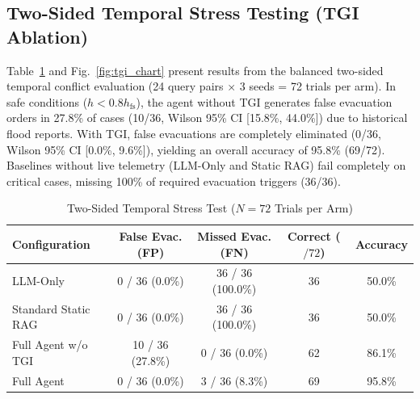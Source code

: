 \documentclass[conference]{IEEEtran}
\begin{document}
\subsection{Two-Sided Temporal Stress Testing (TGI Ablation)}
Table~\ref{tab:tgi} and Fig.~\ref{fig:tgi_chart} present results from the balanced two-sided temporal conflict evaluation (24 query pairs $\times$ 3 seeds = 72 trials per arm). In safe conditions ($h < 0.8 h_{\mathrm{fs}}$), the agent without TGI generates false evacuation orders in 27.8\% of cases (10/36, Wilson 95\% CI [15.8\%, 44.0\%]) due to historical flood reports. With TGI, false evacuations are completely eliminated (0/36, Wilson 95\% CI [0.0\%, 9.6\%]), yielding an overall accuracy of 95.8\% (69/72). Baselines without live telemetry (LLM-Only and Static RAG) fail completely on critical cases, missing 100\% of required evacuation triggers (36/36).

\begin{table}[!t]
\caption{Two-Sided Temporal Stress Test ($N=72$ Trials per Arm)}
\label{tab:tgi}
\centering
\scriptsize
\setlength{\tabcolsep}{1.5pt}
\begin{tabular*}{\columnwidth}{@{\extracolsep{\fill}}lcccc@{}}
\toprule
Configuration & False Evac. (FP) & Missed Evac. (FN) & Correct ($/72$) & Accuracy \\
\midrule
LLM-Only & 0 / 36 (0.0\%) & 36 / 36 (100.0\%) & 36 & 50.0\% \\
Standard Static RAG & 0 / 36 (0.0\%) & 36 / 36 (100.0\%) & 36 & 50.0\% \\
Full Agent w/o TGI & 10 / 36 (27.8\%) & 0 / 36 (0.0\%) & 62 & 86.1\% \\
Full Agent & 0 / 36 (0.0\%) & 3 / 36 (8.3\%) & 69 & 95.8\% \\
\bottomrule
\end{tabular*}
\end{table}
\end{document}
